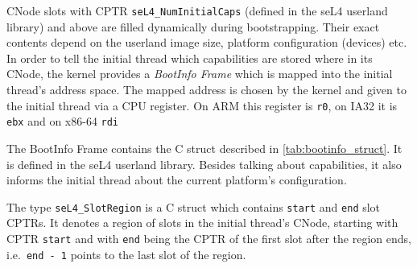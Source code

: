 CNode slots with CPTR \texttt{seL4\_NumInitialCaps} (defined in the seL4
userland library) and above are filled dynamically during
bootstrapping. Their exact contents depend on the userland image size,
platform configuration (devices) etc. In order to tell the initial thread
which capabilities are stored where in its CNode, the kernel provides
a \emph{BootInfo Frame} which is mapped into the initial thread's address
space. The mapped address is chosen by the kernel and given to the initial
thread via a CPU register. On ARM this register is \texttt{r0}, on IA32 it
is \texttt{ebx} and on x86-64 \texttt{rdi}

The BootInfo Frame contains the C struct described in
\autoref{tab:bootinfo_struct}.
It is defined in the seL4 userland library. Besides talking about
capabilities, it also informs the initial thread about
the current platform's configuration.

The type \texttt{seL4\_SlotRegion} is a C struct
which contains \texttt{start} and \texttt{end} slot CPTRs. It denotes a region
of slots in the initial thread's CNode, starting with CPTR \texttt{start} and with
\texttt{end} being the CPTR of the first slot after the region ends, i.e.\
\texttt{end - 1} points to the last slot of the region.

